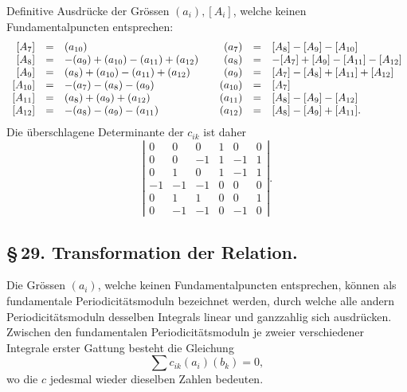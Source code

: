 \documentclass[10pt]{article}
\begin{document}
\noindent Definitive Ausdrücke der Grössen \((a_i),[A_i]\), welche keinen Fundamentalpuncten entsprechen:
\[
\begin{array}{rcl@{\qquad}rcl}
{}[A_7]&=&(a_{10})&(a_7)&=&[A_8]-[A_9]-[A_{10}]\\
{}[A_8]&=&-(a_9)+(a_{10})-(a_{11})+(a_{12})&(a_8)&=&-[A_7]+[A_9]-[A_{11}]-[A_{12}]\\
{}[A_9]&=&(a_8)+(a_{10})-(a_{11})+(a_{12})&(a_9)&=&[A_7]-[A_8]+[A_{11}]+[A_{12}]\\
{}[A_{10}]&=&-(a_7)-(a_8)-(a_9)&(a_{10})&=&[A_7]\\
{}[A_{11}]&=&(a_8)+(a_9)+(a_{12})&(a_{11})&=&[A_8]-[A_9]-[A_{12}]\\
{}[A_{12}]&=&-(a_8)-(a_9)-(a_{11})&(a_{12})&=&[A_8]-[A_9]+[A_{11}].
\end{array}
\]
Die überschlagene Determinante der \(c_{ik}\) ist daher
\[
\left|\begin{array}{rrrrrr}
 0& 0& 0& 1& 0& 0\\
 0& 0&-1& 1&-1& 1\\
 0& 1& 0& 1&-1& 1\\
-1&-1&-1& 0& 0& 0\\
 0& 1& 1& 0& 0& 1\\
 0&-1&-1& 0&-1& 0
\end{array}\right|.
\]

\subsection*{\S\,29. Transformation der Relation.}

Die Grössen \((a_i)\), welche keinen Fundamentalpuncten entsprechen, können als fundamentale Periodicitätsmoduln bezeichnet werden, durch welche alle andern Periodicitätsmoduln desselben Integrals linear und ganzzahlig sich ausdrücken. Zwischen den fundamentalen Periodicitätsmoduln je zweier verschiedener Integrale erster Gattung besteht die Gleichung
\[
\tag{1}\sum c_{ik}(a_i)(b_k)=0,
\]
wo die \(c\) jedesmal wieder dieselben Zahlen bedeuten.
\end{document}
